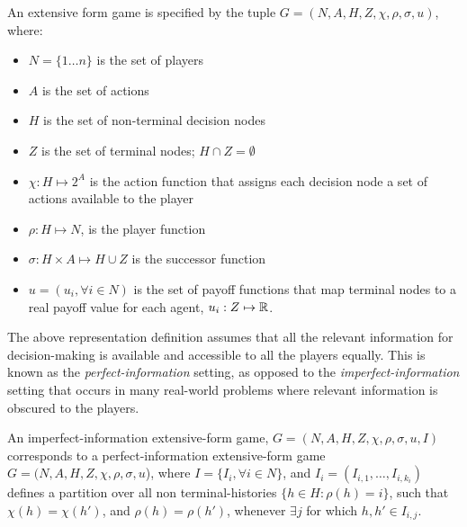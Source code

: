 \begin{definition}
	An extensive form game is specified by the tuple $G=(N, A, H, Z, \chi, \rho, \sigma, u)$, where:
	\begin{itemize}
		\item $N = \{1 \dots n \}$ is the set of players
		\item $A$ is the set of actions
		\item $H$ is the set of non-terminal decision nodes
		\item $Z$ is the set of terminal nodes; $H \cap Z = \emptyset$
		\item $\chi: H \mapsto 2^A$ is the action function that assigns each decision node a set of actions available to the player
		\item $\rho: H \mapsto N$, is the player function
		\item $\sigma: H \times A \mapsto H \cup Z$ is the successor function
		\item $u = (u_i,
			      \forall i \in N)$ is the set of payoff functions that map terminal nodes to a real payoff value
		      for each agent, $u_i: Z \mapsto \mathbb{R}$.
	\end{itemize}
\end{definition}

The above representation definition assumes that all the relevant information for decision-making
is available and accessible to all the players equally.
This is known as the \textit{perfect-information} setting, as opposed to the
\textit{imperfect-information} setting that occurs in many real-world problems where relevant
information is obscured to the players.

\begin{definition}
	An imperfect-information extensive-form game, $G=(N, A, H, Z, \chi, \rho, \sigma, u, I)$ corresponds to a
	perfect-information extensive-form game $G=(N, A, H, Z, \chi, \rho, \sigma, u$), where
	$I = \{I_i, \forall i \in N\}$, and $I_i = (I_{i,1}, \dots, I_{i,k_i})$ defines a partition over all non terminal-histories
	$\{h \in H : \rho(h) = i\}$, such that
	$\chi(h) = \chi(h')$, and $\rho(h)=\rho(h')$, whenever $\exists j$ for which $h,h' \in I_{i,j}$.
\end{definition}

